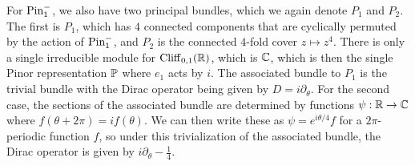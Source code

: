 \begin{exmp}
For $\Pin_1^-$, we also have two principal bundles, which we again denote
$P_1$ and $P_2$. The first is $P_1$, which has $4$ connected components that are cyclically
permuted by the action of $\Pin_1^-$, and $P_2$ is the connected $4$-fold
cover $z \mapsto z^4$. There is only a single irreducible module for $\Cliff_{0,1}(\R)$,
which is $\C$, which is then the single Pinor representation $\P$ where
$e_1$ acts by $i$. The associated bundle to $P_1$ is the trivial bundle with the
Dirac operator being given by $D = i\partial_\theta$. For the second case,
the sections of the associated bundle are determined by functions
$\psi : \R \to \C$ where $f(\theta + 2\pi) = if(\theta)$. We can then write these
as $\psi = e^{i\theta/4}f$ for a $2\pi$-periodic function $f$, so under this
trivialization of the associated bundle, the Dirac operator is given by
$i\partial_\theta - \frac{1}{4}$.
\fi
\end{exmp}
%